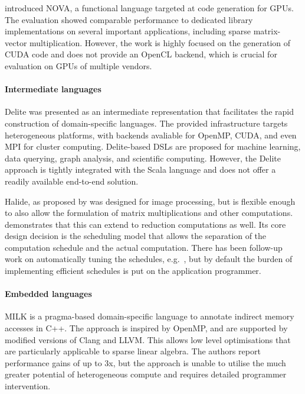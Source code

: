     \citet{collins14nova} introduced NOVA, a functional language targeted at
    code generation for GPUs.
    The evaluation showed comparable performance to dedicated library
    implementations on several important applications, including sparse
    matrix-vector multiplication.
    However, the work is highly focused on the generation of CUDA code and does
    not provide an OpenCL backend, which is crucial for evaluation on GPUs of
    multiple vendors.

    \paragraph*{Intermediate languages}
    Delite \citep{Sujeeth:2014:DCA:2601432.2584665} was presented as an
    intermediate representation that facilitates the rapid construction of
    domain-specific languages.
    The provided infrastructure targets heterogeneous
    platforms, with backends avaliable for OpenMP, CUDA, and even MPI for
    cluster computing.
    Delite-based DSLs are proposed for machine learning, data querying, graph
    analysis, and scientific computing.
    However, the Delite approach is tightly integrated with the Scala
    language and does not offer a readily available end-to-end solution.

    Halide, as proposed by \citet{Ragan-Kelley:2013:HLC:2499370.2462176}
    was designed for image processing, but is flexible enough to also allow the 
    formulation of matrix multiplications and other computations.
    \citet{Suriana:2017:PAR:3049832.3049863} demonstrates that this can extend
    to reduction computations as well.
    Its core design decision is the scheduling model that allows the separation
    of the computation schedule and the actual computation.
    There has been follow-up work on automatically tuning the schedules, e.g.\ 
    \citet{Mullapudi:2016:ASH:2897824.2925952}, but by default the burden of
    implementing efficient schedules is put on the application programmer.

    \paragraph*{Embedded languages}
    MILK \citep{Kiriansky:2016:OIM:2967938.2967948} is a pragma-based
    domain-specific language to annotate indirect memory accesses in C++.
    The approach is inspired by OpenMP, and are supported by modified versions
    of Clang and LLVM.
    This allows low level optimisations that are particularly applicable to
    sparse linear algebra.
    The authors report performance gains of up to 3x, but the approach is unable
    to utilise the much greater potential of heterogeneous compute and requires
    detailed programmer intervention.

